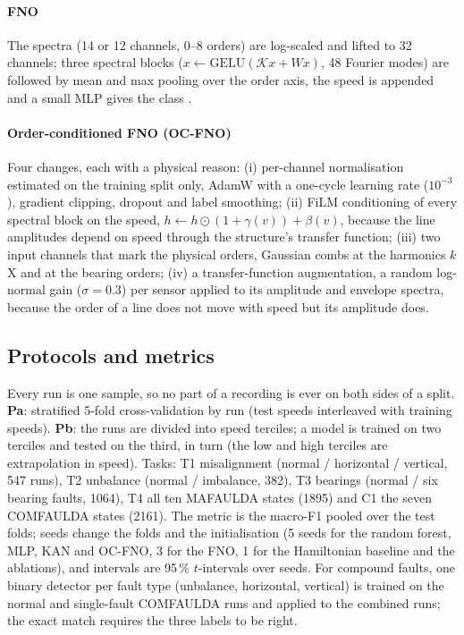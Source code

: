 \documentclass[preprint,review,12pt,authoryear=false]{elsarticle}
\begin{document}
\paragraph{FNO} The spectra (14 or 12 channels, 0--8 orders) are log-scaled and lifted to 32 channels; three spectral
blocks ($x\leftarrow\mathrm{GELU}(\mathcal{K}x+Wx)$, 48 Fourier modes) are followed by mean and max pooling over the
order axis, the speed is appended and a small MLP gives the class \citep{li2021fno}.

\paragraph{Order-conditioned FNO (OC-FNO)} Four changes, each with a physical reason: (i) per-channel normalisation
estimated on the training split only, AdamW with a one-cycle learning rate ($10^{-3}$), gradient clipping, dropout and
label smoothing; (ii) FiLM conditioning \citep{perez2018film} of every spectral block on the speed,
$h\leftarrow h\odot(1+\gamma(v))+\beta(v)$, because the line amplitudes depend on speed through the structure's
transfer function; (iii) two input channels that mark the physical orders, Gaussian combs at the harmonics $k$X and at
the bearing orders; (iv) a transfer-function augmentation, a random log-normal gain ($\sigma=0.3$) per sensor applied
to its amplitude and envelope spectra, because the order of a line does not move with speed but its amplitude does.

\subsection{Protocols and metrics}

Every run is one sample, so no part of a recording is ever on both sides of a split. \textbf{Pa}: stratified 5-fold
cross-validation by run (test speeds interleaved with training speeds). \textbf{Pb}: the runs are divided into speed
terciles; a model is trained on two terciles and tested on the third, in turn (the low and high terciles are
extrapolation in speed). Tasks: T1 misalignment (normal / horizontal / vertical, 547 runs), T2 unbalance (normal /
imbalance, 382), T3 bearings (normal / six bearing faults, 1064), T4 all ten MAFAULDA states (1895) and C1 the seven
COMFAULDA states (2161). The metric is the macro-F1 pooled over the test folds; seeds change the folds and the
initialisation (5 seeds for the random forest, MLP, KAN and OC-FNO, 3 for the FNO, 1 for the Hamiltonian baseline and
the ablations), and intervals are 95\,\% $t$-intervals over seeds. For compound faults, one binary detector per fault
type (unbalance, horizontal, vertical) is trained on the normal and single-fault COMFAULDA runs and applied to the
combined runs; the exact match requires the three labels to be right.
\end{document}
